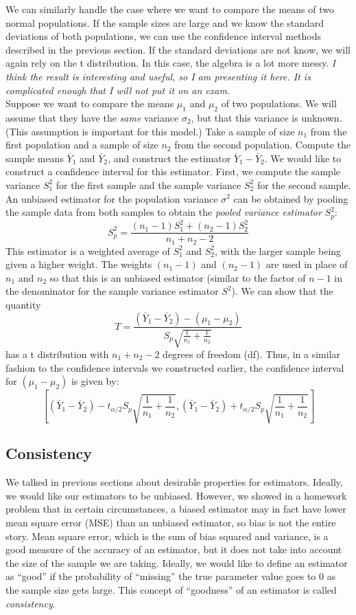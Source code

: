\documentclass[notes.tex]{subfiles}
\begin{document}
We can similarly handle the case where we want to compare the means of two normal populations. If the sample sizes are large and we know the standard deviations of both populations, we can use the confidence interval methods described in the previous section. If the standard deviations are not know, we will again rely on the t distribution. In this case, the algebra is a lot more messy. \emph{I think the result is interesting and useful, so I am presenting it here. It is complicated enough that I will not put it on an exam}.\\

Suppose we want to compare the means $\mu_1$ and $\mu_2$ of two populations. We will assume that they have the \emph{same} variance $\sigma_2$, but that this variance is unknown. (This assumption is important for this model.) Take a sample of size $n_1$ from the first population and a sample of size $n_2$ from the second population. Compute the sample means $\bar{Y}_1$ and $\bar{Y}_2$, and construct the estimator $\bar{Y}_1 - \bar{Y}_2$. We would like to construct a confidence interval for this estimator.
First, we compute the sample variance $S^2_1$ for the first sample and the sample variance $S^2_2$ for the second sample. An unbiased estimator for the population variance $\sigma^2$ can be obtained by pooling the sample data from both samples to obtain the \emph{pooled variance estimator} $S^2_p$:
\[
S^2_p = \frac{(n_1 - 1)S^2_1 + (n_2 - 1)S^2_2}{n_1 + n_2 - 2}
\]
This estimator is a weighted average of $S^2_1$ and $S^2_2$, with the larger sample being given a higher weight. The weights $(n_1 - 1)$ and $(n_2 - 1)$ are used in place of $n_1$ and $n_2$ so that this is an unbiased estimator (similar to the factor of $n-1$ in the denominator for the sample variance estimator $S^2$). We can show that the quantity
\[
T = \dfrac{ (\bar{Y}_1 - \bar{Y}_2) - (\mu_1 - \mu_2) }{S_p \sqrt{ \frac{1}{n_1} + \frac{1}{n_2} }}
\]
has a t distribution with $n_1 + n_2 - 2$ degrees of freedom (df). Thus, in a similar fashion to the confidence intervals we constructed earlier, the confidence interval for $(\mu_1 - \mu_2)$ is given by:
\[
\left[ (\bar{Y}_1 - \bar{Y}_2) - t_{\alpha/2} S_p \sqrt{ \frac{1}{n_1} + \frac{1}{n_2} }, (\bar{Y}_1 - \bar{Y}_2) + t_{\alpha/2} S_p \sqrt{ \frac{1}{n_1} + \frac{1}{n_2} }\right]
\]

\subsection{Consistency}
We talked in previous sections about desirable properties for estimators. Ideally, we would like our estimators to be unbiased. However, we showed in a homework problem that in certain circumstances, a biased estimator may in fact have lower mean square error (MSE) than an unbiased estimator, so bias is not the entire story. Mean square error, which is the sum of bias squared and variance, is a good measure of the accuracy of an estimator, but it does not take into account the size of the sample we are taking. Ideally, we would like to define an estimator as ``good'' if the probability of ``missing'' the true parameter value goes to 0 as the sample size gets large. This concept of ``goodness'' of an estimator is called \emph{consistency}.\\
\end{document}
